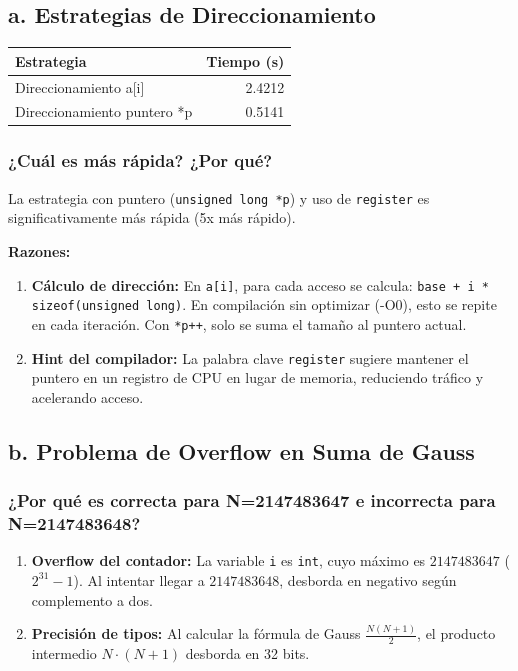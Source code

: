\documentclass[11pt,a4paper]{article}
\begin{document}
\subsection*{a. Estrategias de Direccionamiento}

\begin{center}
\begin{tabular}{|l|r|}
\hline
\textbf{Estrategia} & \textbf{Tiempo (s)} \\
\hline
Direccionamiento a[i] & 2.4212 \\
Direccionamiento puntero *p & 0.5141 \\
\hline
\end{tabular}
\end{center}

\subsubsection*{¿Cuál es más rápida? ¿Por qué?}

La estrategia con puntero (\texttt{unsigned long *p}) y uso de \texttt{register} es significativamente más rápida (5x más rápido).

\textbf{Razones:}
\begin{enumerate}
\item \textbf{Cálculo de dirección:} En \texttt{a[i]}, para cada acceso se calcula: \texttt{base + i * sizeof(unsigned long)}. En compilación sin optimizar (-O0), esto se repite en cada iteración. Con \texttt{*p++}, solo se suma el tamaño al puntero actual.

\item \textbf{Hint del compilador:} La palabra clave \texttt{register} sugiere mantener el puntero en un registro de CPU en lugar de memoria, reduciendo tráfico y acelerando acceso.
\end{enumerate}

\subsection*{b. Problema de Overflow en Suma de Gauss}

\subsubsection*{¿Por qué es correcta para N=2147483647 e incorrecta para N=2147483648?}

\begin{enumerate}
\item \textbf{Overflow del contador:} La variable \texttt{i} es \texttt{int}, cuyo máximo es $2147483647$ ($2^{31}-1$). Al intentar llegar a $2147483648$, desborda en negativo según complemento a dos.

\item \textbf{Precisión de tipos:} Al calcular la fórmula de Gauss $\frac{N(N+1)}{2}$, el producto intermedio $N \cdot (N+1)$ desborda en 32 bits.
\end{enumerate}
\end{document}
